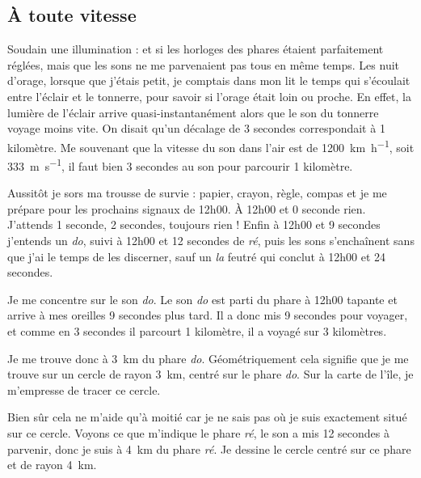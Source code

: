 \documentclass[class=report,crop=false]{standalone}
\begin{document}
\newpage
\thispagestyle{empty}
\def\myscale{0.9}
\vfill
\begin{center}
{
}   
\end{center}




\newpage

\subsection{À toute vitesse}

Soudain une illumination : et si les horloges des phares étaient parfaitement réglées, mais que 
les sons ne me parvenaient pas tous en même temps. Les nuit d'orage, 
lorsque que j'étais petit, je comptais dans mon lit le temps qui s'écoulait entre
l'éclair et le tonnerre, pour savoir si l'orage était loin ou proche.
En effet, la lumière de l'éclair arrive quasi-instantanément alors que le son du tonnerre 
voyage moins vite. On disait qu'un décalage de 3 secondes correspondait à 1 kilomètre.
Me souvenant que la vitesse du son dans l'air est de \SI{1200}{\kilo \meter \per \hour},
soit \SI{333}{\meter\per\second}, il faut bien 3 secondes au son pour parcourir 
1 kilomètre.

Aussitôt je sors ma trousse de survie : papier, crayon, règle, compas
et je me prépare pour les prochains signaux de 12h00.
\`A 12h00 et 0 seconde rien. J'attends 1 seconde, 2 secondes, toujours rien !
Enfin à 12h00 et 9 secondes j'entends un \emph{do}, 
suivi à 12h00 et 12 secondes de \emph{ré}, puis les sons s’enchaînent sans que j'ai le temps
de les discerner, sauf un \emph{la} feutré qui conclut à 12h00 et 24 secondes.

Je me concentre sur le son \emph{do}. Le son \emph{do} est parti du phare à 12h00 tapante
et arrive à mes oreilles 9 secondes plus tard. Il a donc mis 9 secondes pour voyager,
et comme en 3 secondes il parcourt 1 kilomètre, il a voyagé sur 3 kilomètres.

Je me trouve donc à \SI{3}{\kilo \meter} du phare \emph{do}. Géométriquement cela signifie que je me trouve
sur un cercle de rayon \SI{3}{\kilo \meter}, centré sur le phare \emph{do}.
Sur la carte de l'île, je m'empresse de tracer ce cercle.


Bien sûr cela ne m'aide qu'à moitié car je ne sais pas où je suis exactement situé sur ce cercle.
Voyons ce que m'indique le phare \emph{ré}, le son a mis 12 secondes à parvenir, donc je suis 
à \SI{4}{\kilo \meter} du phare \emph{ré}. Je dessine le cercle centré sur ce phare et de rayon 
\SI{4}{\kilo \meter}. 
\end{document}

